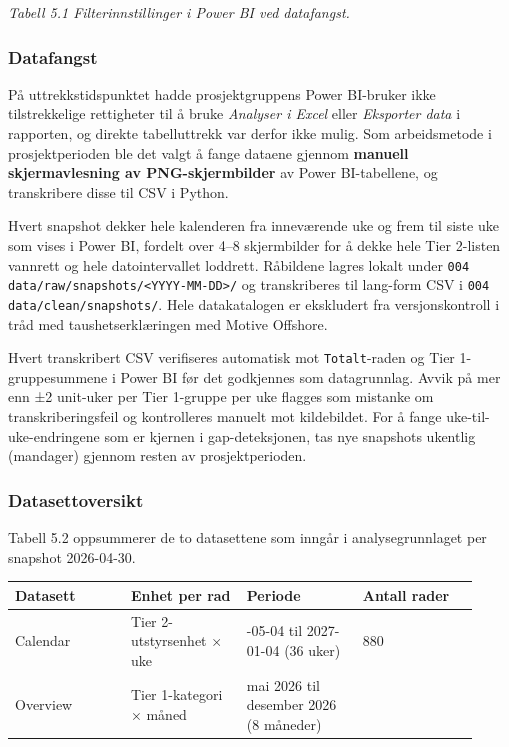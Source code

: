 \documentclass[a4paper,11pt]{article}
\begin{document}
\begin{center}\small\textit{Tabell 5.1 Filterinnstillinger i Power BI ved datafangst.}\end{center}

\subsubsection{Datafangst}

På uttrekkstidspunktet hadde prosjektgruppens Power BI-bruker ikke tilstrekkelige rettigheter til å bruke \textit{Analyser i Excel} eller \textit{Eksporter data} i rapporten, og direkte tabelluttrekk var derfor ikke mulig. Som arbeidsmetode i prosjektperioden ble det valgt å fange dataene gjennom \textbf{manuell skjermavlesning av PNG-skjermbilder} av Power BI-tabellene, og transkribere disse til CSV i Python.

Hvert snapshot dekker hele kalenderen fra inneværende uke og frem til siste uke som vises i Power BI, fordelt over 4–8 skjermbilder for å dekke hele Tier 2-listen vannrett og hele datointervallet loddrett. Råbildene lagres lokalt under \texttt{004 data/raw/snapshots/<YYYY-MM-DD>/} og transkriberes til lang-form CSV i \texttt{004 data/clean/snapshots/}. Hele datakatalogen er ekskludert fra versjonskontroll i tråd med taushetserklæringen med Motive Offshore.

Hvert transkribert CSV verifiseres automatisk mot \texttt{Totalt}-raden og Tier 1-gruppesummene i Power BI før det godkjennes som datagrunnlag. Avvik på mer enn ±2 unit-uker per Tier 1-gruppe per uke flagges som mistanke om transkriberingsfeil og kontrolleres manuelt mot kildebildet. For å fange uke-til-uke-endringene som er kjernen i gap-deteksjonen, tas nye snapshots ukentlig (mandager) gjennom resten av prosjektperioden.

\subsubsection{Datasettoversikt}

Tabell 5.2 oppsummerer de to datasettene som inngår i analysegrunnlaget per snapshot 2026-04-30.

\begin{longtable}{|>{\RaggedRight}p{0.230\linewidth}|>{\RaggedRight}p{0.230\linewidth}|>{\RaggedRight}p{0.230\linewidth}|>{\RaggedRight}p{0.230\linewidth}|}
\hline
\textbf{Datasett} & \textbf{Enhet per rad} & \textbf{Periode} & \textbf{Antall rader} \\
\hline
\endhead
Calendar & Tier 2-utstyrsenhet × uke & 2026-05-04 til 2027-01-04 (36 uker) & 2 880 \\
\hline
Overview & Tier 1-kategori × måned & mai 2026 til desember 2026 (8 måneder) & 152 \\
\hline
\end{longtable}
\end{document}
